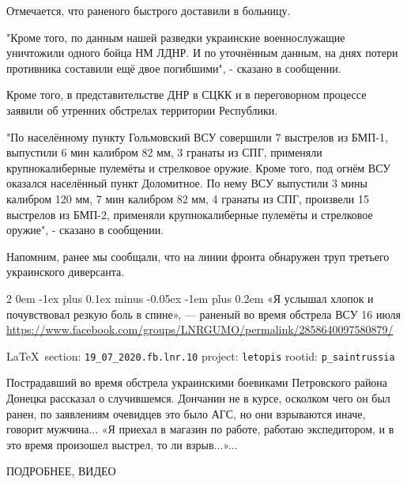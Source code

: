 \documentclass[a4paper,11pt]{extreport}
\makeatletter
\renewcommand\subsection{%
  \clearpage
    \@startsection{subsection}%
    {2}%
    {0em}%
    {-1ex plus 0.1ex minus -0.05ex}%
    {-1em plus 0.2em}%
    {\scshape\bfseries\Large}%
}
\makeatother
\begin{document}
Отмечается, что раненого быстрого доставили в больницу.

"Кроме того, по данным нашей разведки украинские военнослужащие уничтожили
одного бойца НМ ЛДНР. И по уточнённым данным, на днях потери противника
составили ещё двое погибшими", - сказано в сообщении.

Кроме того, в представительстве ДНР в СЦКК и в переговорном процессе заявили об
утренних обстрелах территории Республики.

"По населённому пункту Гольмовский ВСУ совершили 7 выстрелов из БМП-1,
выпустили 6 мин калибром 82 мм, 3 гранаты из СПГ, применяли крупнокалиберные
пулемёты и стрелковое оружие. Кроме того, под огнём ВСУ оказался населённый
пункт Доломитное. По нему ВСУ выпустили 3 мины калибром 120 мм, 7 мин калибром
82 мм, 4 гранаты из СПГ, произвели 15 выстрелов из БМП-2, применяли
крупнокалиберные пулемёты и стрелковое оружие", - сказано в сообщении.

Напомним, ранее мы сообщали, что на линии фронта обнаружен труп третьего
украинского диверсанта. 
 
 

\subsection{«Я услышал хлопок и почувствовал резкую боль в спине», --- раненый во время обстрела ВСУ 16 июля}
\label{sec:19_07_2020.fb.lnr.10}
\url{https://www.facebook.com/groups/LNRGUMO/permalink/2858640097580879/}
  
\vspace{0.5cm}
{\small\LaTeX~section: \verb|19_07_2020.fb.lnr.10| project: \verb|letopis| rootid: \verb|p_saintrussia|}
\vspace{0.5cm}

Пострадавший во время обстрела украинскими боевиками Петровского района Донецка
рассказал о случившемся.  Дончанин не в курсе, осколком чего он был ранен, по
заявлениям очевидцев это было АГС, но они взрываются иначе, говорит мужчина...
«Я приехал в магазин по работе, работаю экспедитором, и в это время произошел
выстрел, то ли взрыв...»...

ПОДРОБНЕЕ, ВИДЕО 
 
\end{document}
